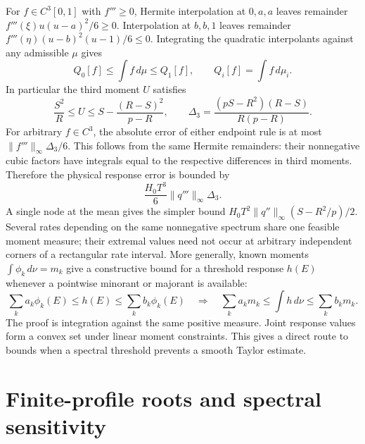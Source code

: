 For $f\in C^3[0,1]$ with $f'''\ge0$, Hermite interpolation at $0,a,a$ leaves remainder $f'''(\xi)u(u-a)^2/6\ge0$. Interpolation at $b,b,1$ leaves remainder $f'''(\eta)(u-b)^2(u-1)/6\le0$. Integrating the quadratic interpolants against any admissible $\mu$ gives
\begin{equation}
 Q_0[f]\le\int f\,d\mu\le Q_1[f],\qquad Q_i[f]=\int f\,d\mu_i.
 \label{v:radau_order}
\end{equation}
In particular the third moment $U$ satisfies
\begin{equation}
 \frac{S^2}{R}\le U\le S-\frac{(R-S)^2}{p-R},\qquad
 \Delta_3=\frac{(pS-R^2)(R-S)}{R(p-R)} .
 \label{v:third_moment}
\end{equation}
For arbitrary $f\in C^3$, the absolute error of either endpoint rule is at most
$\|f'''\|_\infty\Delta_3/6$. This follows from the same Hermite remainders: their nonnegative cubic factors have integrals equal to the respective differences in third moments. Therefore the physical response error is bounded by
\begin{equation}
 \frac{H_0T^3}{6}\|q'''\|_\infty\Delta_3 .
 \label{v:delay_error}
\end{equation}
A single node at the mean gives the simpler bound
$H_0T^2\|q''\|_\infty(S-R^2/p)/2$. Several rates depending on the same nonnegative spectrum share one feasible moment measure; their extremal values need not occur at arbitrary independent corners of a rectangular rate interval.
More generally, known moments $\int\phi_k\,d\nu=m_k$ give a constructive bound for a threshold response $h(E)$ whenever a pointwise minorant or majorant is available:
\begin{equation}
 \sum_ka_k\phi_k(E)\le h(E)\le\sum_kb_k\phi_k(E)
 \quad\Longrightarrow\quad
 \sum_ka_km_k\le\int h\,d\nu\le\sum_kb_km_k .
 \label{v:shared_moment_dual}
\end{equation}
The proof is integration against the same positive measure. Joint response values form a convex set under linear moment constraints. This gives a direct route to bounds when a spectral threshold prevents a smooth Taylor estimate.


\section{Finite-profile roots and spectral sensitivity}
\label{v:profile_roots}

